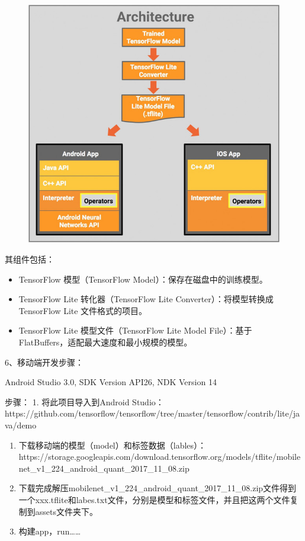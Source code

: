 \begin{figure}
\centering
\includegraphics{./img/ch17/tflite_artc.JPEG}
\caption{}
\end{figure}

其组件包括：

\begin{itemize}
\item
  TensorFlow 模型（TensorFlow Model）：保存在磁盘中的训练模型。
\item
  TensorFlow Lite 转化器（TensorFlow Lite Converter）：将模型转换成
  TensorFlow Lite 文件格式的项目。
\item
  TensorFlow Lite 模型文件（TensorFlow Lite Model File）：基于
  FlatBuffers，适配最大速度和最小规模的模型。
\end{itemize}

6、移动端开发步骤：

Android Studio 3.0, SDK Version API26, NDK Version 14

步骤： 1. 将此项目导入到Android Studio：
https://github.com/tensorflow/tensorflow/tree/master/tensorflow/contrib/lite/java/demo

\begin{enumerate}
\def\labelenumi{\arabic{enumi}.}
\setcounter{enumi}{1}
\item
  下载移动端的模型（model）和标签数据（lables）：
  https://storage.googleapis.com/download.tensorflow.org/models/tflite/mobilenet\_v1\_224\_android\_quant\_2017\_11\_08.zip
\item
  下载完成解压mobilenet\_v1\_224\_android\_quant\_2017\_11\_08.zip文件得到一个xxx.tflite和labes.txt文件，分别是模型和标签文件，并且把这两个文件复制到assets文件夹下。
\item
  构建app，run\ldots{}\ldots{}
\end{enumerate}

